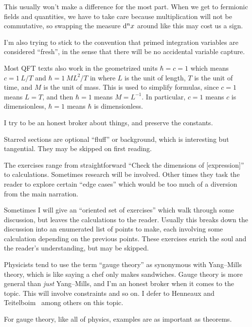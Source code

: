 This usually won't make a difference for the most part. When we get to
fermionic fields and quantities, we have to take care because
multiplication will not be commutative, so swapping the measure
$\mathrm{d}^{n}x$ around like this may cost us a sign.

I'm also trying to stick to the convention that primed integration
variables are considered ``fresh'', in the sense that there will be no
accidental variable capture.

Most QFT texts also work in the geometrized units $\hbar=c=1$ which
means $c=1~L/T$ and $\hbar=1~ML^{2}/T$ in where $L$ is the unit of
length, $T$ is the unit of time, and $M$ is the unit of mass. This is
used to simplify formulas, since $c=1$ means $L=T$, and then $\hbar=1$
means $M=L^{-1}$. In particular, $c=1$ means $c$ is dimensionless,
$\hbar=1$ means $\hbar$ is dimensionless.

I try to be an honest broker about things, and preserve the constants.

Starred sections are optional ``fluff'' or background, which is
interesting but tangential. They may be skipped on first reading.

The exercises range from straightforward ``Check the dimensions of
[expression]'' to calculations. Sometimes research will be involved.
Other times they task the reader to explore certain ``edge cases''
which would be too much of a diversion from the main narration.

Sometimes I will give an ``oriented set of exercises'' which walk
through some discussion, but leaves the calculations to the
reader. Usually this breaks down the discussion into an enumerated list
of points to make, each involving some calculation depending on the
previous points. These exercises enrich the soul and the reader's
understanding, but may be skipped.

Physicists tend to use the term ``gauge theory'' as synonymous with
Yang--Mills theory, which is like saying a chef only makes sandwiches.
Gauge theory is more general than \emph{just} Yang--Mills, and I'm an
honest broker when it comes to the topic. This will involve constraints
and so on. I defer to Henneaux and Teitelboim~\cite{Henneaux:1992ig}
among others on this topic.

For gauge theory, like all of physics, examples are as important as
theorems. 
